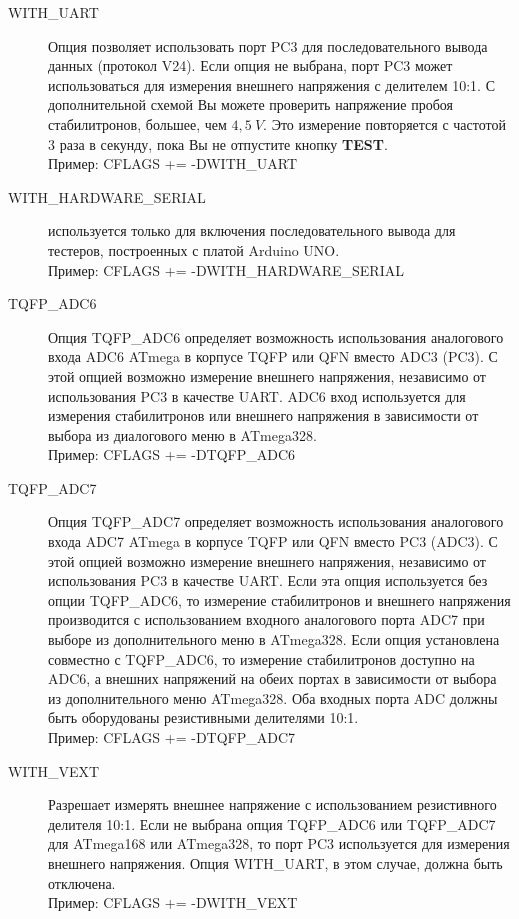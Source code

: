 \begin{description}
  \item[WITH\_UART] Опция позволяет использовать порт PC3 для последовательного вывода данных (протокол V24). 
Если опция не выбрана, порт PC3 может использоваться для измерения внешнего напряжения  с делителем 10:1. 
С дополнительной схемой Вы можете проверить напряжение пробоя стабилитронов, большее, чем \(4,5~V\). 
Это измерение повторяется с частотой 3 раза в секунду, пока Вы не отпустите кнопку \textbf{ TEST}.\\
Пример: CFLAGS += -DWITH\_UART

  \item[WITH\_HARDWARE\_SERIAL] используется только для включения последовательного вывода для тестеров, построенных с платой Arduino UNO.\\
Пример:  CFLAGS += -DWITH\_HARDWARE\_SERIAL

  \item[TQFP\_ADC6] Опция TQFP\_ADC6 определяет возможность использования аналогового входа ADC6 ATmega в корпусе 
TQFP или QFN вместо ADC3 (PC3).
С этой опцией возможно измерение внешнего напряжения, независимо от использования PC3 в качестве UART.
ADC6 вход используется для измерения стабилитронов или внешнего напряжения в зависимости от выбора из 
диалогового меню в ATmega328.\\
Пример: CFLAGS += -DTQFP\_ADC6

  \item[TQFP\_ADC7] Опция TQFP\_ADC7 определяет возможность использования аналогового входа ADC7 ATmega в корпусе 
TQFP или QFN вместо PC3 (ADC3). С этой опцией возможно измерение внешнего напряжения, независимо от использования 
PC3 в качестве UART. Если эта опция используется без опции TQFP\_ADC6, то измерение стабилитронов и внешнего
напряжения производится с использованием входного аналогового порта ADC7 при выборе из дополнительного меню в 
ATmega328. Если опция установлена совместно с TQFP\_ADC6, то измерение стабилитронов доступно на ADC6, а внешних 
напряжений на обеих портах в зависимости от выбора из дополнительного меню ATmega328. Оба входных порта ADC
должны быть оборудованы резистивными делителями 10:1.\\
Пример: CFLAGS += -DTQFP\_ADC7

  \item[WITH\_VEXT] Разрешает измерять внешнее напряжение с использованием резистивного делителя 10:1.
Если не выбрана опция TQFP\_ADC6 или TQFP\_ADC7 для ATmega168 или ATmega328, то порт PC3 используется для измерения 
внешнего напряжения.
Опция WITH\_UART, в этом случае, должна быть отключена.\\
Пример: CFLAGS += -DWITH\_VEXT


\end{description}
